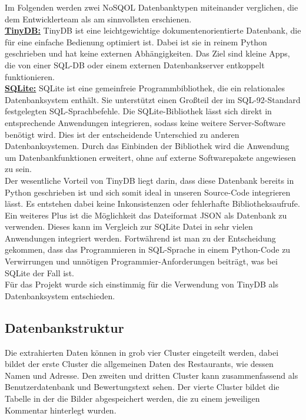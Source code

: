 \documentclass[a4paper,oneside,12pt]{report}
\begin{document}
					Im Folgenden werden zwei NoSQOL Datenbanktypen miteinander verglichen, die dem Entwicklerteam als am sinnvollsten erschienen.
					\\
					\newline
					\underline{\textbf{TinyDB:}}
					\newline TinyDB ist eine leichtgewichtige dokumentenorientierte Datenbank, die für eine einfache Bedienung optimiert ist. Dabei ist sie in reinem Python geschrieben und hat keine externen Abhängigkeiten. Das Ziel sind kleine Apps, die von einer SQL-DB oder einem externen Datenbankserver entkoppelt funktionieren. \cite{bib-tinydb}
					\\
					\newline					
					\underline{\textbf{SQLite:}}
					\newline SQLite ist eine gemeinfreie Programmbibliothek, die ein relationales Datenbanksystem enthält. Sie unterstützt einen Großteil der im SQL-92-Standard festgelegten SQL-Sprachbefehle. Die SQLite-Bibliothek lässt sich direkt in entsprechende Anwendungen integrieren, sodass keine weitere Server-Software benötigt wird. Dies ist der entscheidende Unterschied zu anderen Datenbanksystemen. Durch das Einbinden der Bibliothek wird die Anwendung um Datenbankfunktionen erweitert, ohne auf externe Softwarepakete angewiesen zu sein. \cite{bib-sqlite}
					\\
					\newline Der wesentliche Vorteil von TinyDB liegt darin, dass diese Datenbank bereits in Python geschrieben ist und sich somit ideal in unseren Source-Code integrieren lässt. Es entstehen dabei keine Inkonsistenzen oder fehlerhafte Bibliotheksaufrufe. Ein weiteres Plus ist die Möglichkeit das Dateiformat JSON als Datenbank zu verwenden. Dieses kann im Vergleich zur SQLite Datei in sehr vielen Anwendungen integriert werden. Fortwährend ist man zu der Entscheidung gekommen, dass das Programmieren in SQL-Sprache in einem Python-Code zu Verwirrungen und unnötigen Programmier-Anforderungen beiträgt, was bei SQLite der Fall ist.
					\\
					Für das Projekt wurde sich einstimmig für die Verwendung von TinyDB als Datenbanksystem entschieden.
					
							
			\subsection{Datenbankstruktur}
			
				Die extrahierten Daten können in grob vier Cluster eingeteilt werden, dabei bildet der erste Cluster die allgemeinen Daten des Restaurants, wie dessen Namen und Adresse. Den zweiten und dritten Cluster kann zusammenfassend als Benutzerdatenbank und Bewertungstext sehen. Der vierte Cluster bildet die Tabelle in der die Bilder abgespeichert werden, die zu einem jeweiligen Kommentar hinterlegt wurden.
				
\end{document}
